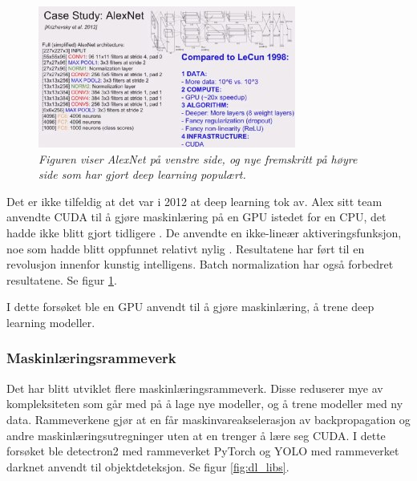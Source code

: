 \begin{figure}[t]
\begin{center} 
\includegraphics[scale=1.0]{figures/comparison}
\caption{\small \sl Figuren viser AlexNet på venstre side, og nye fremskritt på høyre side som har gjort deep learning populært. \cite{Karpathy 2014} \label{fig:comparison}}
\end{center} 
\end{figure} 

Det er ikke tilfeldig at det var i 2012 at deep learning tok av. Alex sitt team anvendte CUDA til å gjøre maskinlæring på en GPU istedet for en CPU, det hadde ikke blitt gjort tidligere \cite{Krizhevsky m.fl. 2012}. De anvendte en ikke-lineær aktiveringsfunksjon, noe som hadde blitt oppfunnet relativt nylig \cite{LeCun m.fl. 1998 s. 3}. Resultatene har ført til en revolusjon innenfor kunstig intelligens. Batch normalization har også forbedret resultatene. Se figur \ref{fig:comparison}. \cite{Ioffe og Szegedy 2015 s. 1}

I dette forsøket ble en GPU anvendt til å gjøre maskinlæring, å trene deep learning modeller.

\subsubsection{Maskinlæringsrammeverk}

Det har blitt utviklet flere maskinlæringsrammeverk. Disse reduserer mye av kompleksiteten som går med på å lage nye modeller, og å trene modeller med ny data. Rammeverkene gjør at en får maskinvareakselerasjon av backpropagation og andre maskinlæringsutregninger uten at en trenger å lære seg CUDA. I dette forsøket ble detectron2 med rammeverket PyTorch og YOLO med rammeverket darknet anvendt til objektdeteksjon. Se figur \ref{fig:dl_libs}.

